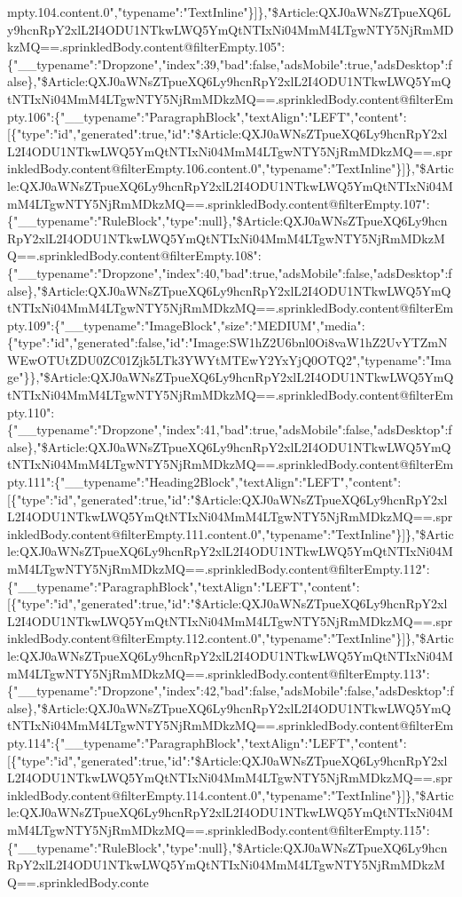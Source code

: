 mpty.104.content.0","typename":"TextInline"\}{]}\},"\$Article:QXJ0aWNsZTpueXQ6Ly9hcnRpY2xlL2I4ODU1NTkwLWQ5YmQtNTIxNi04MmM4LTgwNTY5NjRmMDkzMQ==.sprinkledBody.content@filterEmpty.105":\{"\_\_typename":"Dropzone","index":39,"bad":false,"adsMobile":true,"adsDesktop":false\},"\$Article:QXJ0aWNsZTpueXQ6Ly9hcnRpY2xlL2I4ODU1NTkwLWQ5YmQtNTIxNi04MmM4LTgwNTY5NjRmMDkzMQ==.sprinkledBody.content@filterEmpty.106":\{"\_\_typename":"ParagraphBlock","textAlign":"LEFT","content":{[}\{"type":"id","generated":true,"id":"\$Article:QXJ0aWNsZTpueXQ6Ly9hcnRpY2xlL2I4ODU1NTkwLWQ5YmQtNTIxNi04MmM4LTgwNTY5NjRmMDkzMQ==.sprinkledBody.content@filterEmpty.106.content.0","typename":"TextInline"\}{]}\},"\$Article:QXJ0aWNsZTpueXQ6Ly9hcnRpY2xlL2I4ODU1NTkwLWQ5YmQtNTIxNi04MmM4LTgwNTY5NjRmMDkzMQ==.sprinkledBody.content@filterEmpty.107":\{"\_\_typename":"RuleBlock","type":null\},"\$Article:QXJ0aWNsZTpueXQ6Ly9hcnRpY2xlL2I4ODU1NTkwLWQ5YmQtNTIxNi04MmM4LTgwNTY5NjRmMDkzMQ==.sprinkledBody.content@filterEmpty.108":\{"\_\_typename":"Dropzone","index":40,"bad":true,"adsMobile":false,"adsDesktop":false\},"\$Article:QXJ0aWNsZTpueXQ6Ly9hcnRpY2xlL2I4ODU1NTkwLWQ5YmQtNTIxNi04MmM4LTgwNTY5NjRmMDkzMQ==.sprinkledBody.content@filterEmpty.109":\{"\_\_typename":"ImageBlock","size":"MEDIUM","media":\{"type":"id","generated":false,"id":"Image:SW1hZ2U6bnl0Oi8vaW1hZ2UvYTZmNWEwOTUtZDU0ZC01Zjk5LTk3YWYtMTEwY2YxYjQ0OTQ2","typename":"Image"\}\},"\$Article:QXJ0aWNsZTpueXQ6Ly9hcnRpY2xlL2I4ODU1NTkwLWQ5YmQtNTIxNi04MmM4LTgwNTY5NjRmMDkzMQ==.sprinkledBody.content@filterEmpty.110":\{"\_\_typename":"Dropzone","index":41,"bad":true,"adsMobile":false,"adsDesktop":false\},"\$Article:QXJ0aWNsZTpueXQ6Ly9hcnRpY2xlL2I4ODU1NTkwLWQ5YmQtNTIxNi04MmM4LTgwNTY5NjRmMDkzMQ==.sprinkledBody.content@filterEmpty.111":\{"\_\_typename":"Heading2Block","textAlign":"LEFT","content":{[}\{"type":"id","generated":true,"id":"\$Article:QXJ0aWNsZTpueXQ6Ly9hcnRpY2xlL2I4ODU1NTkwLWQ5YmQtNTIxNi04MmM4LTgwNTY5NjRmMDkzMQ==.sprinkledBody.content@filterEmpty.111.content.0","typename":"TextInline"\}{]}\},"\$Article:QXJ0aWNsZTpueXQ6Ly9hcnRpY2xlL2I4ODU1NTkwLWQ5YmQtNTIxNi04MmM4LTgwNTY5NjRmMDkzMQ==.sprinkledBody.content@filterEmpty.112":\{"\_\_typename":"ParagraphBlock","textAlign":"LEFT","content":{[}\{"type":"id","generated":true,"id":"\$Article:QXJ0aWNsZTpueXQ6Ly9hcnRpY2xlL2I4ODU1NTkwLWQ5YmQtNTIxNi04MmM4LTgwNTY5NjRmMDkzMQ==.sprinkledBody.content@filterEmpty.112.content.0","typename":"TextInline"\}{]}\},"\$Article:QXJ0aWNsZTpueXQ6Ly9hcnRpY2xlL2I4ODU1NTkwLWQ5YmQtNTIxNi04MmM4LTgwNTY5NjRmMDkzMQ==.sprinkledBody.content@filterEmpty.113":\{"\_\_typename":"Dropzone","index":42,"bad":false,"adsMobile":false,"adsDesktop":false\},"\$Article:QXJ0aWNsZTpueXQ6Ly9hcnRpY2xlL2I4ODU1NTkwLWQ5YmQtNTIxNi04MmM4LTgwNTY5NjRmMDkzMQ==.sprinkledBody.content@filterEmpty.114":\{"\_\_typename":"ParagraphBlock","textAlign":"LEFT","content":{[}\{"type":"id","generated":true,"id":"\$Article:QXJ0aWNsZTpueXQ6Ly9hcnRpY2xlL2I4ODU1NTkwLWQ5YmQtNTIxNi04MmM4LTgwNTY5NjRmMDkzMQ==.sprinkledBody.content@filterEmpty.114.content.0","typename":"TextInline"\}{]}\},"\$Article:QXJ0aWNsZTpueXQ6Ly9hcnRpY2xlL2I4ODU1NTkwLWQ5YmQtNTIxNi04MmM4LTgwNTY5NjRmMDkzMQ==.sprinkledBody.content@filterEmpty.115":\{"\_\_typename":"RuleBlock","type":null\},"\$Article:QXJ0aWNsZTpueXQ6Ly9hcnRpY2xlL2I4ODU1NTkwLWQ5YmQtNTIxNi04MmM4LTgwNTY5NjRmMDkzMQ==.sprinkledBody.conte